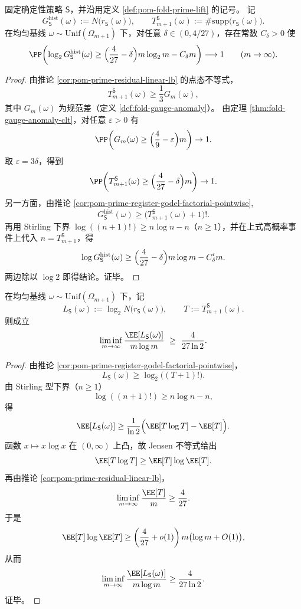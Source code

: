

\begin{theorem}\label{thm:conclusion-godel-history-superlinear-highprob}
固定确定性策略 \(\mathsf S\)，并沿用定义 \ref{def:pom-fold-prime-lift} 的记号。
记
\[
G_{\mathsf S}^{\mathrm{hist}}(\omega):=N\!\bigl(r_{\mathsf S}(\omega)\bigr),\qquad
T_{m+1}^{\mathsf S}(\omega):=\#\mathrm{supp}\bigl(r_{\mathsf S}(\omega)\bigr).
\]
在均匀基线 \(\omega\sim\mathrm{Unif}(\Omega_{m+1})\) 下，对任意 \(\delta\in(0,4/27)\)，存在常数 \(C_\delta>0\) 使
\[
\PP\!\left(
\log_2 G_{\mathsf S}^{\mathrm{hist}}(\omega)\ge
\Bigl(\frac{4}{27}-\delta\Bigr)m\log_2 m-C_\delta m
\right)\longrightarrow 1\qquad(m\to\infty).
\]
\end{theorem}
\begin{proof}
由推论 \ref{cor:pom-prime-residual-linear-lb} 的点态不等式，
\[
T_{m+1}^{\mathsf S}(\omega)\ge \frac{1}{3}G_m(\omega),
\]
其中 \(G_m(\omega)\) 为规范差（定义 \ref{def:fold-gauge-anomaly}）。
由定理 \ref{thm:fold-gauge-anomaly-clt}，对任意 \(\varepsilon>0\) 有
\[
\PP\!\left(G_m(\omega)\ge \Bigl(\frac{4}{9}-\varepsilon\Bigr)m\right)\to 1.
\]
取 \(\varepsilon=3\delta\)，得到
\[
\PP\!\left(T_{m+1}^{\mathsf S}(\omega)\ge \Bigl(\frac{4}{27}-\delta\Bigr)m\right)\to 1.
\]
另一方面，由推论 \ref{cor:pom-prime-register-godel-factorial-pointwise},
\[
G_{\mathsf S}^{\mathrm{hist}}(\omega)\ge \bigl(T_{m+1}^{\mathsf S}(\omega)+1\bigr)!.
\]
再用 Stirling 下界 \(\log((n+1)!)\ge n\log n-n\)（\(n\ge 1\)），并在上式高概率事件上代入 \(n=T_{m+1}^{\mathsf S}\)，得
\[
\log G_{\mathsf S}^{\mathrm{hist}}(\omega)
\ge \Bigl(\frac{4}{27}-\delta\Bigr)m\log m-C_\delta' m.
\]
两边除以 \(\log 2\) 即得结论。证毕。
\end{proof}

\begin{theorem}\label{thm:conclusion-godel-history-expected-liminf}
在均匀基线 \(\omega\sim\mathrm{Unif}(\Omega_{m+1})\) 下，记
\[
L_{\mathsf S}(\omega):=\log_2 N\!\bigl(r_{\mathsf S}(\omega)\bigr),\qquad
T:=T_{m+1}^{\mathsf S}(\omega).
\]
则成立
\[
\liminf_{m\to\infty}\frac{\EE[L_{\mathsf S}(\omega)]}{m\log m}
\ \ge\
\frac{4}{27\ln 2}.
\]
\end{theorem}
\begin{proof}
由推论 \ref{cor:pom-prime-register-godel-factorial-pointwise}，
\[
L_{\mathsf S}(\omega)\ge \log_2\!\bigl((T+1)!\bigr).
\]
由 Stirling 型下界（\(n\ge 1\)）
\[
\log((n+1)!)\ge n\log n-n,
\]
得
\[
\EE[L_{\mathsf S}(\omega)]
\ge \frac{1}{\ln 2}\Bigl(\EE[T\log T]-\EE[T]\Bigr).
\]
函数 \(x\mapsto x\log x\) 在 \((0,\infty)\) 上凸，故 Jensen 不等式给出
\[
\EE[T\log T]\ge \EE[T]\log \EE[T].
\]
再由推论 \ref{cor:pom-prime-residual-linear-lb}，
\[
\liminf_{m\to\infty}\frac{\EE[T]}{m}\ge \frac{4}{27}.
\]
于是
\[
\EE[T]\log\EE[T]
\ge
\left(\frac{4}{27}+o(1)\right)m\bigl(\log m+O(1)\bigr),
\]
从而
\[
\liminf_{m\to\infty}\frac{\EE[L_{\mathsf S}(\omega)]}{m\log m}
\ge \frac{4}{27\ln 2}.
\]
证毕。
\end{proof}

